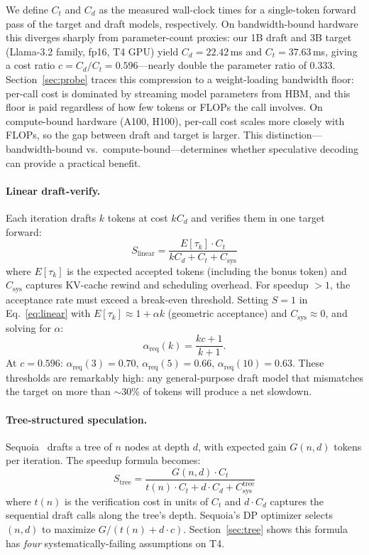 \documentclass[letterpaper,twocolumn,10pt]{article}
\begin{document}
We define $C_t$ and $C_d$ as the measured wall-clock times for a single-token forward pass of the target and draft models, respectively.
On bandwidth-bound hardware this diverges sharply from parameter-count proxies: our 1B draft and 3B target (Llama-3.2 family, fp16, T4 GPU) yield $C_d = 22.42$\,ms and $C_t = 37.63$\,ms, giving a cost ratio $c = C_d/C_t = 0.596$---nearly double the parameter ratio of $0.333$.
Section~\ref{sec:probe} traces this compression to a weight-loading bandwidth floor: per-call cost is dominated by streaming model parameters from HBM, and this floor is paid regardless of how few tokens or FLOPs the call involves.
On compute-bound hardware (A100, H100), per-call cost scales more closely with FLOPs, so the gap between draft and target is larger.
This distinction---bandwidth-bound vs.\ compute-bound---determines whether speculative decoding can provide a practical benefit.

\paragraph{Linear draft-verify.}
Each iteration drafts $k$ tokens at cost $kC_d$ and verifies them in one target forward:
\begin{equation}
\label{eq:linear}
S_{\text{linear}} = \frac{E[\tau_k] \cdot C_t}{kC_d + C_t + C_{\text{sys}}}
\end{equation}
where $E[\tau_k]$ is the expected accepted tokens (including the bonus token) and $C_{\text{sys}}$ captures KV-cache rewind and scheduling overhead.
For speedup $> 1$, the acceptance rate must exceed a break-even threshold.
Setting $S = 1$ in Eq.~\ref{eq:linear} with $E[\tau_k] \approx 1 + \alpha k$ (geometric acceptance) and $C_{\text{sys}} \approx 0$, and solving for $\alpha$:
\begin{equation}
\label{eq:breakeven}
\alpha_{\text{req}}(k) = \frac{kc + 1}{k + 1}.
\end{equation}
At $c = 0.596$: $\alpha_{\text{req}}(3) = 0.70$, $\alpha_{\text{req}}(5) = 0.66$, $\alpha_{\text{req}}(10) = 0.63$.
These thresholds are remarkably high: any general-purpose draft model that mismatches the target on more than $\sim$30\% of tokens will produce a net slowdown.

\paragraph{Tree-structured speculation.}
Sequoia~\cite{chen2024sequoia} drafts a tree of $n$ nodes at depth $d$, with expected gain $G(n,d)$ tokens per iteration.
The speedup formula becomes:
\begin{equation}
\label{eq:tree}
S_{\text{tree}} = \frac{G(n,d) \cdot C_t}{t(n) \cdot C_t + d \cdot C_d + C_{\text{sys}}^{\text{tree}}}
\end{equation}
where $t(n)$ is the verification cost in units of $C_t$ and $d \cdot C_d$ captures the sequential draft calls along the tree's depth.
Sequoia's DP optimizer selects $(n, d)$ to maximize $G/(t(n) + d \cdot c)$.
Section~\ref{sec:tree} shows this formula has \emph{four} systematically-failing assumptions on T4.
\end{document}
